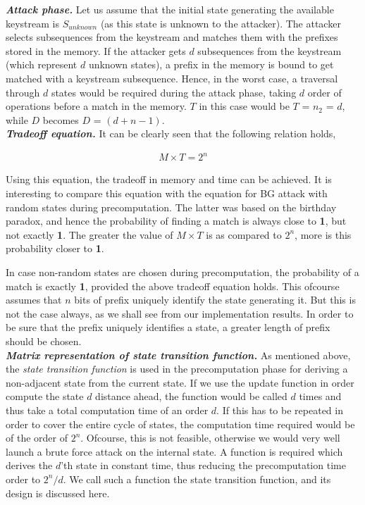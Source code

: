 \textit{\textbf{Attack phase.}} Let us assume that the initial state generating the available keystream is $S_{unknown}$ (as this state is unknown to the attacker). The attacker selects subsequences from the keystream and matches them with the prefixes stored in the memory. If the attacker gets $d$ subsequences from the keystream (which represent $d$ unknown states), a prefix in the memory is bound to get matched with a keystream subsequence. Hence, in the worst case, a traversal through $d$ states would be required during the attack phase, taking $d$ order of operations before a match in the memory. $T$ in this case would be $T$ = $n_2$ = $d$, while $D$ becomes $D$ = $(d + n - 1)$.\\

\textit{\textbf{Tradeoff equation.}} It can be clearly seen that the following relation holds,

\begin{align}
\label{eq:tmto-non-random} M \times T = 2^n
\end{align}

Using this equation, the tradeoff in memory and time can be achieved. It is interesting to compare this equation with the equation for BG attack with random states during precomputation. The latter was based on the birthday paradox, and hence the probability of finding a match is always close to \textbf{1}, but not exactly \textbf{1}. The greater the value of $M \times T$ is as compared to $2^n$, more is this probability closer to \textbf{1}.

In case non-random states are chosen during precomputation, the probability of a match is exactly \textbf{1}, provided the above tradeoff equation holds. This ofcourse assumes that $n$ bits of prefix uniquely identify the state generating it. But this is not the case always, as we shall see from our implementation results. In order to be sure that the prefix uniquely identifies a state, a greater length of prefix should be chosen.\\

\textit{\textbf{Matrix representation of state transition function.}} As mentioned above, the \emph{state transition function} is used in the precomputation phase for deriving a non-adjacent state from the current state. If we use the update function in order compute the state $d$ distance ahead, the function would be called $d$ times and thus take a total computation time of an order $d$. If this has to be repeated in order to cover the entire cycle of states, the computation time required would be of the order of $2^n$. Ofcourse, this is not feasible, otherwise we would very well launch a brute force attack on the internal state. A function is required which derives the $d$'th state in constant time, thus reducing the precomputation time order to $2^{n}/d$. We call such a function the state transition function, and its design is discussed here. 

